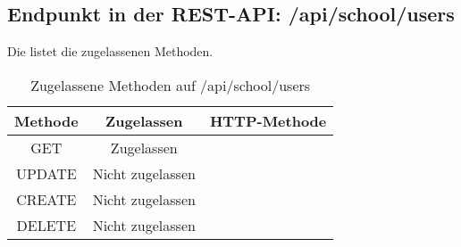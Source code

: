 \subsection{Endpunkt in der REST-API: /api/school/users}
Die  listet die zugelassenen Methoden. 

\begin{table}[!htbp]
	\begin{tabular}{|c|c|c|}
		\hline
			\textbf{Methode} & \textbf{Zugelassen} & \textbf{HTTP-Methode} \\ \hline
			GET & Zugelassen &  \\ \hline
			UPDATE & Nicht zugelassen & \\ \hline 
			CREATE & Nicht zugelassen & \\ \hline 
			DELETE & Nicht zugelassen & \\ \hline
	\end{tabular}

		\caption{Zugelassene Methoden auf /api/school/users}
		\label{tab:end:rest:api:school:users:meth}
\end{table}



